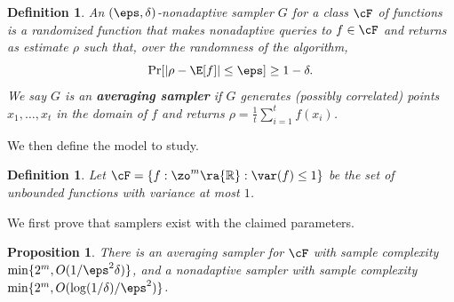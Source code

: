 \documentclass[11pt]{article}
\newtheorem{proposition}[theorem]{Proposition}
\newtheorem{definition}[theorem]{Definition}
\newcommand{\R}{{\mathbb R}}
\begin{document}
\begin{definition}
An $(\eps,\delta)$-nonadaptive sampler $G$ for a 
%
class $\cF$ of functions  %
is a randomized function that makes nonadaptive queries to $f\in \cF$ and returns as estimate $\rho$ such that, over the randomness of the algorithm,
\[\Pr[|\rho-\E[f]|\leq \eps]\geq 1- \delta.\]
We say $G$ is an \textbf{averaging sampler} if $G$ generates (possibly correlated) points $x_1,\ldots,x_t$ in the domain of $f$ and returns $\rho=\frac{1}{t}\sum_{i=1}^tf(x_i)$.
\end{definition}
We then define the model to study.
\begin{definition}
Let $\cF=\{f:\zo^m\ra\R:\var(f)\leq 1\}$ be the set of unbounded functions with variance at most $1$.
\end{definition}
We first prove that samplers exist with the claimed parameters. 
\begin{proposition}
There is an averaging sampler for $\cF$ with sample complexity $\min\{2^m,O(1/\eps^2\delta)\}$, and a nonadaptive sampler with sample complexity $\min\{2^m,O(\log(1/\delta)/\eps^2)\}$.
\end{proposition}
\end{document}
